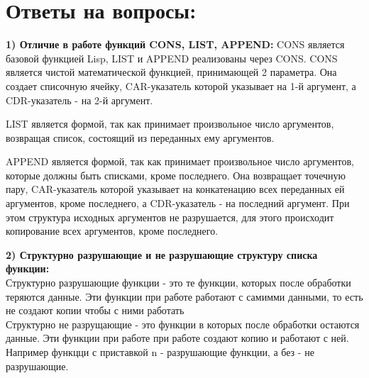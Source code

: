 \documentclass[a4paper, 12pt]{article}
\begin{document}
\section*{Ответы на вопросы:}
\hspace*{-7mm} \textbf{1) Отличие в работе функций CONS, LIST, APPEND:}
CONS является базовой функцией Lisp, LIST и APPEND реализованы через CONS. CONS является чистой математической функцией, принимающей 2 параметра. Она создает списочную ячейку, CAR-указатель которой указывает на 1-й аргумент, а CDR-указатель - на 2-й аргумент.

LIST является формой, так как принимает произвольное число аргументов, возвращая список, состоящий из переданных ему аргументов.

APPEND является формой, так как принимает произвольное число аргументов, которые должны быть списками, кроме последнего. Она возвращает точечную пару, CAR-указатель которой указывает на конкатенацию всех переданных ей аргументов, кроме последнего, а CDR-указатель - на последний аргумент. При этом структура исходных аргументов не разрушается, для этого происходит копирование всех аргументов, кроме последнего.

\hspace*{-13mm} \textbf{2) Структурно разрушающие и не разрушающие структуру списка функции:}
\\ Структурно разрушающие функции - это те функции, которых после обработки теряются данные. Эти функции при работе работают с самимми данными, то есть не создают копии чтобы с ними работать 
\\Структурно не разрущающие - это функции в которых после обработки остаются данные. Эти функции при работе при работе создают копию и работают с ней.
Например функцци с приставкой n - разрушающие функции, а без - не разрушающие.
\end{document}
